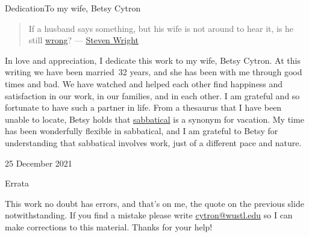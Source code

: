 \begin{frame}{Dedication}{To my wife, Betsy Cytron}
\begin{quote}
    If a husband says something, but his wife is not around to hear it, is he still \href{https://en.wikipedia.org/wiki/Ron\%27s_Gone_Wrong}{wrong}? --- \href{https://en.wikipedia.org/wiki/Steven_Wright}{Steven Wright}
\end{quote}
In love and appreciation, I dedicate this work to my wife, Betsy Cytron.  At this writing we have been married~32 years, and she has been with me through good times and bad. We have watched and helped each other find happiness and satisfaction in our work, in our families, and in each other.  I am grateful and so fortunate to have such a partner in life.
\SmallSkip{}
From a thesaurus that I have been unable to locate,  Betsy holds that \href{https://www.merriam-webster.com/dictionary/sabbatical}{sabbatical} is a synonym for vacation.  My time has been wonderfully flexible in sabbatical, and I am grateful to Betsy for understanding that sabbatical involves work, just of a different pace and nature.
\begin{flushright}25 December 2021\end{flushright}
\end{frame}
\begin{frame}{Errata}

This work no doubt has errors, and that's on me, the quote on the previous slide notwithstanding.  If you find a mistake please write \href{mailto:cytron@wustl.edu}{cytron@wustl.edu} so I can make corrections to this material.
\SmallSkip{}
Thanks for your help!
\end{frame}

